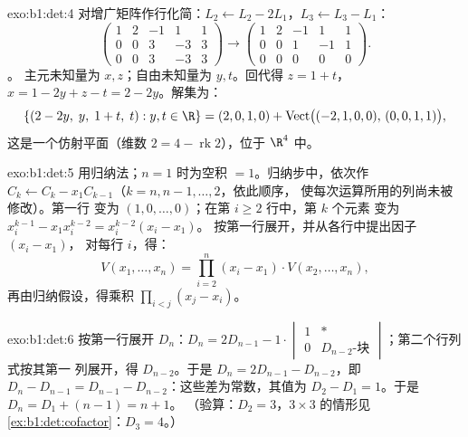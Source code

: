 \begin{solution}{exo:b1:det:4}
对增广矩阵作行化简：$L_2 \leftarrow L_2 - 2L_1$，$L_3
\leftarrow L_3 - L_1$：
\[
\begin{pmatrix}
1 & 2 & -1 & 1 & 1\\
0 & 0 & 3 & -3 & 3\\
0 & 0 & 3 & -3 & 3
\end{pmatrix}
\to
\begin{pmatrix}
1 & 2 & -1 & 1 & 1\\
0 & 0 & 1 & -1 & 1\\
0 & 0 & 0 & 0 & 0
\end{pmatrix}.
\]。
主元未知量为 $x, z$；自由未知量为 $y, t$。回代得 $z =
1 + t$，$x = 1 - 2y + z - t = 2 - 2y$。解集为：
\[
\{(2 - 2y,\; y,\; 1 + t,\; t) : y, t \in \R\}
= (2, 0, 1, 0) + \operatorname{Vect}\bigl((-2,1,0,0),\,
(0,0,1,1)\bigr),
\]
这是一个仿射平面（维数 $2 = 4 - \operatorname{rk} 2$），位于 $\R^4$ 中。
\end{solution}

\begin{solution}{exo:b1:det:5}
用归纳法；$n = 1$ 时为空积 $= 1$。归纳步中，依次作
$C_k \leftarrow C_k - x_1 C_{k-1}$（$k = n, n-1, \dots, 2$，依此顺序，
使每次运算所用的列尚未被修改）。第一行
变为 $(1, 0, \dots, 0)$；在第 $i \geq 2$ 行中，第 $k$ 个元素
变为 $x_i^{k-1} - x_1 x_i^{k-2} = x_i^{k-2}(x_i - x_1)$。
按第一行展开，并从各行中提出因子 $(x_i - x_1)$，
对每行 $i$，得：
\[
V(x_1, \dots, x_n)
= \prod_{i=2}^{n} (x_i - x_1)\cdot V(x_2, \dots, x_n),
\]
再由归纳假设，得乘积 $\prod_{i<j}(x_j
- x_i)$。
\end{solution}

\begin{solution}{exo:b1:det:6}
按第一行展开 $D_n$：$D_n = 2 D_{n-1} -
1\cdot\begin{vmatrix} 1 & \ast\\ 0 & D_{n-2}\text{-块}
\end{vmatrix}$；第二个行列式按其第一
列展开，得 $D_{n-2}$。于是 $D_n = 2D_{n-1} - D_{n-2}$，即 $D_n -
D_{n-1} = D_{n-1} - D_{n-2}$：这些差为常数，其值为
$D_2 - D_1 = 1$。于是 $D_n = D_1 + (n - 1) = n + 1$。
（验算：$D_2 = 3$，$3\times3$ 的情形见
\cref{ex:b1:det:cofactor}：$D_3 = 4$。）
\end{solution}

